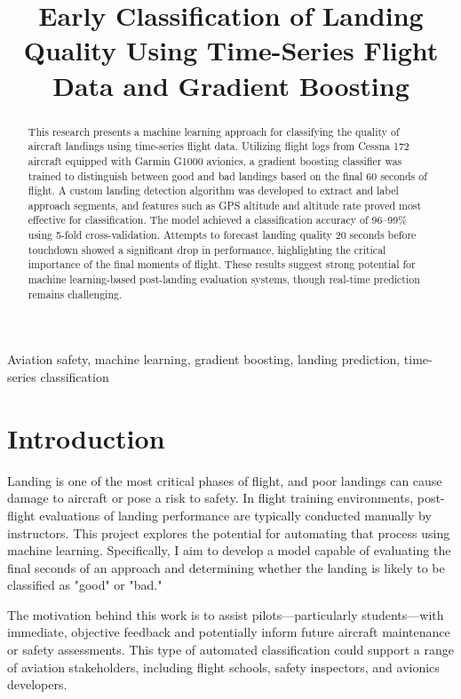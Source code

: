 \documentclass[conference]{IEEEtran}
\title{Early Classification of Landing Quality Using Time-Series Flight Data and Gradient Boosting}
\author{\IEEEauthorblockN{Nathan Johnson}
\IEEEauthorblockA{\textit{Embry-Riddle Aeronautical University} \\
Prescott, Arizona, USA \\
johnsn63@my.erau.edu}}
\begin{document}
\maketitle

\begin{abstract}
This research presents a machine learning approach for classifying the quality of aircraft landings using time-series flight data. Utilizing flight logs from Cessna 172 aircraft equipped with Garmin G1000 avionics, a gradient boosting classifier was trained to distinguish between good and bad landings based on the final 60 seconds of flight. A custom landing detection algorithm was developed to extract and label approach segments, and features such as GPS altitude and altitude rate proved most effective for classification. The model achieved a classification accuracy of 96–99\% using 5-fold cross-validation. Attempts to forecast landing quality 20 seconds before touchdown showed a significant drop in performance, highlighting the critical importance of the final moments of flight. These results suggest strong potential for machine learning-based post-landing evaluation systems, though real-time prediction remains challenging.
\end{abstract}

\begin{IEEEkeywords}
Aviation safety, machine learning, gradient boosting, landing prediction, time-series classification
\end{IEEEkeywords}

\section{Introduction}
Landing is one of the most critical phases of flight, and poor landings can cause damage to aircraft or pose a risk to safety. In flight training environments, post-flight evaluations of landing performance are typically conducted manually by instructors. This project explores the potential for automating that process using machine learning. Specifically, I aim to develop a model capable of evaluating the final seconds of an approach and determining whether the landing is likely to be classified as "good" or "bad."

The motivation behind this work is to assist pilots—particularly students—with immediate, objective feedback and potentially inform future aircraft maintenance or safety assessments. This type of automated classification could support a range of aviation stakeholders, including flight schools, safety inspectors, and avionics developers.
\end{document}
